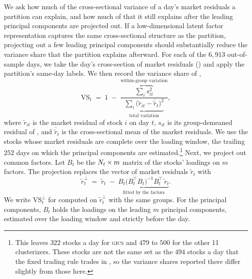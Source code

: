 We ask how much of the cross-sectional variance of a day's market residuals a partition can explain, and how much of that it still explains after the leading principal components are projected out. If a low-dimensional latent factor representation captures the same cross-sectional structure as the partition, projecting out a few leading principal components should substantially reduce the variance share that the partition explains afterward. For each of the $6{,}913$ out-of-sample days, we take the day's cross-section of market residuals () and apply the partition's same-day labels. We then record the variance share of ,
%
\begin{equation}\label{eq:vshare}
  \mathrm{VS}_t \;=\; 1 \;-\; \frac{\overbrace{\textstyle\sum_i s_{it}^2}^{\text{within-group variation}}}{\underbrace{\textstyle\sum_i \bigl(\tilde r_{it} - \bar{\tilde r}_t\bigr)^2}_{\text{total variation}}},
\end{equation}
%
where $\tilde r_{it}$ is the market residual of stock $i$ on day $t$, $s_{it}$ is its group-demeaned residual of , and $\bar{\tilde r}_t$ is the cross-sectional mean of the market residuals. We use the stocks whose market residuals are complete over the loading window, the trailing $252$ days on which the principal components are estimated.\footnote{This leaves $322$ stocks a day for \textsc{gics} and $479$ to $500$ for the other 11 clusterizers. These stocks are not the same set as the $494$ stocks a day that the fixed trading rule trades in , so the variance shares reported there differ slightly from those here.} Next, we project out common factors. Let $B_t$ be the $N_t \times m$ matrix of the stocks' loadings on $m$ factors. The projection replaces the vector of market residuals $\tilde r_t$ with
%
\begin{equation}\label{eq:proj}
  \tilde r_t^{\perp} \;=\; \tilde r_t \;-\; \underbrace{B_t \bigl(B_t^{\top} B_t\bigr)^{-1} B_t^{\top}\, \tilde r_t}_{\text{fitted by the factors}} .
\end{equation}
%
We write $\mathrm{VS}_t^{\perp}$ for  computed on $\tilde r_t^{\perp}$ with the same groups. For the principal components, $B_t$ holds the loadings on the leading $m$ principal components, estimated over the loading window and strictly before the day.

